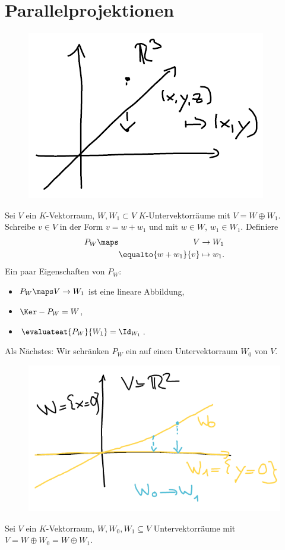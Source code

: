 \section{Parallelprojektionen}
\label{parallelprojektionen}
\begin{wiederholung*}
    \begin{beispiel*}
        \begin{figure}[H]
            \centering
            \includegraphics[width=0.5\linewidth]{figures/r_3_projektion}
            \label{fig:r_3_projektion}
        \end{figure}
        
    \end{beispiel*}
    Sei \( V \) ein \( K \)-Vektorraum, \( W, W_1\subset V \) \( K \)-Untervektorräume mit \( V=W\oplus W_1 \).
    Schreibe \( v\in V \) in der Form \( v=w+w_1 \) und mit \( w\in W \), \( w_1\in W_1 \). Definiere
    \begin{align*}
        P_W\maps \begin{aligned}[t] 
            V&\to W_1\\
            \equalto{w+w_1}{v}&\mapsto w_1.
        \end{aligned}
    \end{align*}
    Ein paar Eigenschaften von \( P_W \):
    \begin{itemize}
        \item \( P_W\maps V \to W_1 \) ist eine lineare Abbildung,
        \item \( \Ker-{P_W}=W \),
        \item \( \evaluateat{P_W}{W_1}=\Id_{W_1} \).
    \end{itemize}
    Als Nächstes:
    Wir schränken \( P_W \) ein auf einen Untervektorraum \( W_0 \) von \( V \).
    \begin{figure}[H]
        \centering
        \includegraphics[width=0.5\linewidth]{figures/projektion_einschraenkung_auf_w_0}
        \label{fig:projektion_einschraenkung_auf_w_0}
    \end{figure}
    \begin{lemma}\label{projektion_isomorph}
        Sei \( V \) ein \( K \)-Vektorraum, \( W,W_0, W_1\subseteq V \) Untervektorräume mit \( V=W\oplus W_0=W\oplus W_1 \).


\end{lemma}
\end{wiederholung*}
